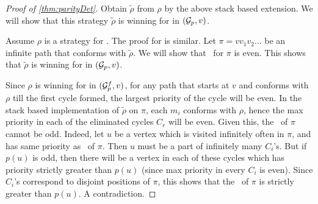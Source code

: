 \begin{proof}[Proof of \autoref{thm:parityDet}]
    Obtain $\tilde{\rho}$ from $\rho$ by the above stack based extension. We will show that this strategy $ \tilde{\rho}$ is winning for  in $(\mathcal{G}_p,v)$.

    Assume $\rho$ is a strategy for . The proof for  is similar. Let $\pi = v v_1 v_2 \ldots $ be an infinite path that conforms with $\tilde{\rho}$. We will show that \mip\ for $\pi$ is even. This shows that $\tilde{\rho}$ is winning for  in $(\mathcal{G}_p,v)$.
    
    Since $\rho$ is winning for  in $(\mathcal{G}^f_p,v)$, for any path that starts at $v$ and conforms with $\rho$ till the first cycle formed, the largest priority of the cycle will be even. In the stack based implementation of $ \tilde{\rho}$ on $\pi$, each $m_i$ conforms with $\rho$, hence the max priority in each of the eliminated cycles $C_r$ will be even. Given this, the \mip\ of $\pi$ cannot be odd. Indeed, let $u$ be a vertex which is visited infinitely often in $\pi$, and has same priority as \mip\ of $\pi$. Then $u$ must be a part of infinitely many $C_i$'s. But if $p(u)$ is odd, then there will be a vertex in each of these cycles which has priority strictly greater than $p(u)$ (since max priority in every $C_i$ is even). Since $C_i$'s correspond to disjoint positions of $\pi$, this shows that the \mip\ of $\pi$ is strictly greater than $p(u)$. A contradiction.

\end{proof}
